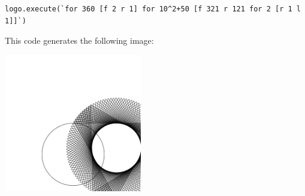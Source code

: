 \begin{lstlisting}[frame=single]
logo.execute(`for 360 [f 2 r 1] for 10^2+50 [f 321 r 121 for 2 [r 1 l 1]]`)
\end{lstlisting}

This code generates the following image:

\begin{center}
\includegraphics[width=60mm,keepaspectratio]{figures/logo.png}
\end{center}